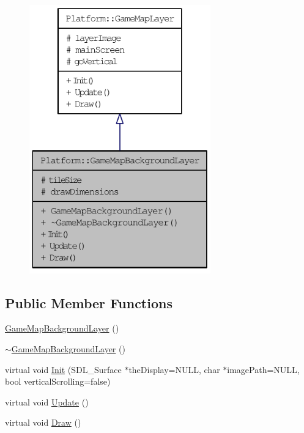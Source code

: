 \begin{figure}[H]
\begin{center}
\leavevmode
\includegraphics[width=222pt]{d5/d7b/class_platform_1_1_game_map_background_layer__coll__graph}
\end{center}
\end{figure}
\subsection*{Public Member Functions}
\begin{CompactItemize}
\item 
\hyperlink{class_platform_1_1_game_map_background_layer_16460906bb5c157b819a509d36492bbc}{GameMapBackgroundLayer} ()
\item 
\hyperlink{class_platform_1_1_game_map_background_layer_e2472fc42632246e23270264e568887a}{$\sim$GameMapBackgroundLayer} ()
\item 
virtual void \hyperlink{class_platform_1_1_game_map_background_layer_449a95c15187b1ae358a0216a589df3f}{Init} (SDL\_\-Surface $\ast$theDisplay=NULL, char $\ast$imagePath=NULL, bool verticalScrolling=false)
\item 
virtual void \hyperlink{class_platform_1_1_game_map_background_layer_6cc21a3c3418b8c76c010963bef37800}{Update} ()
\item 
virtual void \hyperlink{class_platform_1_1_game_map_background_layer_f6910e7841ae5315baa5fd956202a982}{Draw} ()
\end{CompactItemize}
